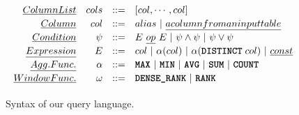 \begin{figure}[!t]
\[\begin{array}{rrll}
\emph{Column List} & 
\cols & 
\grammareq & 
[\col, \mydots, \col]
\\[2pt]

\emph{Column} & 
\col & 
\grammareq & 
\colalias \ | \ \emph{a column from an input table} 
\\[2pt]

\emph{Condition} & 
\sqlpredicate & 
\grammareq & 
\sqlexpr \ \emph{op} \ \sqlexpr \ | \ \sqlpredicate \land \sqlpredicate \ | \ \sqlpredicate \lor \sqlpredicate 
\\[2pt] 

\emph{Expression} & 
\sqlexpr & 
\grammareq & 
\col \ | \ \agg(\col) \ | \ \agg(\sqldistinct \sqlspace \col) \ | \ \emph{const}
\\[2pt] 

\emph{Agg. Func.} & 
\agg & 
\grammareq & 
\sqlmax \ | \ \sqlmin \ | \ \sqlavg \ | \ \sqlsum \ | \ \sqlcount 
\\[2pt] 

\emph{Window Func.} & 
\windowfunc & 
\grammareq & 
\sqldenserank \ | \ \sqlrank 
\\[2pt] 

\end{array}
\]
\vspace{-15pt}
\caption{Syntax of our query language.}
\label{slab:fig:querysyntax}
\vspace{-20pt}
\end{figure}


